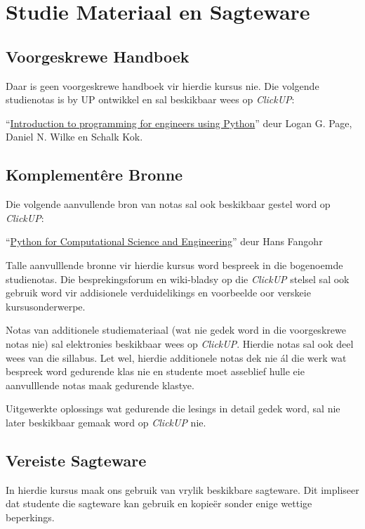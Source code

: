 \section{Studie Materiaal en Sagteware}
    \subsection{Voorgeskrewe Handboek}
        Daar is geen voorgeskrewe handboek vir hierdie kursus nie. Die volgende 
        studienotas is by UP ontwikkel en sal beskikbaar wees op \textit{ClickUP}:
        
        ``\underline{Introduction to programming for engineers using
          Python}'' deur Logan G. Page, Daniel N. Wilke en Schalk Kok.
    
    \subsection{Komplement\^{e}re Bronne}
        Die volgende aanvullende bron van notas sal ook beskikbaar gestel
        word op \textit{ClickUP}:
            
        ``\underline{Python for Computational Science and Engineering}'' deur 
        Hans Fangohr
        
        Talle aanvulllende bronne vir hierdie kursus word bespreek in die
        bogenoemde studienotas.  Die besprekingsforum en wiki-bladsy
        op die \textit{ClickUP} stelsel sal ook gebruik word vir addisionele
        verduidelikings en voorbeelde oor verskeie kursusonderwerpe. 
        
        Notas van additionele studiemateriaal (wat nie gedek word in die voorgeskrewe
        notas nie) sal elektronies beskikbaar wees op \textit{ClickUP}. Hierdie 
        notas sal ook deel wees van die sillabus.  Let wel, hierdie additionele notas 
        dek nie \'{a}l die werk wat bespreek word gedurende klas nie en studente
        moet asseblief hulle eie aanvulllende notas maak gedurende klastye.
        
        Uitgewerkte oplossings wat gedurende die lesings in detail gedek word, sal nie
        later beskikbaar gemaak word op \textit{ClickUP} nie.
        

    \subsection{Vereiste Sagteware}
	In hierdie kursus maak ons gebruik van vrylik beskikbare sagteware.
	Dit impliseer dat studente die sagteware kan gebruik en kopie\"er sonder
	enige wettige beperkings.

